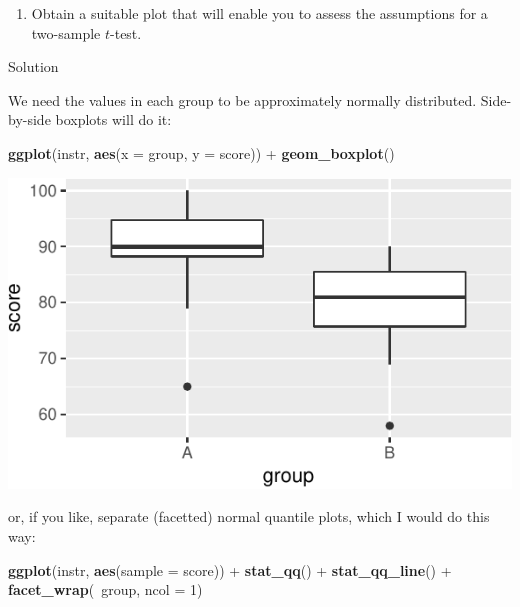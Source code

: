 \documentclass[]{tufte-book}
\newenvironment{Shaded}{}{}
\newcommand{\DataTypeTok}[1]{\textcolor[rgb]{0.56,0.13,0.00}{#1}}
\newcommand{\DecValTok}[1]{\textcolor[rgb]{0.25,0.63,0.44}{#1}}
\newcommand{\KeywordTok}[1]{\textcolor[rgb]{0.00,0.44,0.13}{\textbf{#1}}}
\newcommand{\NormalTok}[1]{#1}
\newcommand{\OperatorTok}[1]{\textcolor[rgb]{0.40,0.40,0.40}{#1}}
\newcommand{\StringTok}[1]{\textcolor[rgb]{0.25,0.44,0.63}{#1}}
\providecommand{\tightlist}{%
  \setlength{\itemsep}{0pt}\setlength{\parskip}{0pt}}
\theoremstyle{definition}
\theoremstyle{definition}
\theoremstyle{definition}
\theoremstyle{remark}
\begin{document}
\begin{enumerate}
\def\labelenumi{(\alph{enumi})}
\setcounter{enumi}{1}
\tightlist
\item
  Obtain a suitable plot that will enable you to assess the assumptions
  for a two-sample \(t\)-test.
\end{enumerate}

Solution

We need the values in each group to be approximately normally
distributed. Side-by-side boxplots will do it:

\begin{Shaded}
\begin{Highlighting}[]
\KeywordTok{ggplot}\NormalTok{(instr, }\KeywordTok{aes}\NormalTok{(}\DataTypeTok{x =}\NormalTok{ group, }\DataTypeTok{y =}\NormalTok{ score)) }\OperatorTok{+}\StringTok{ }\KeywordTok{geom_boxplot}\NormalTok{()}
\end{Highlighting}
\end{Shaded}

\includegraphics{07-sign-mood-median_files/figure-latex/unnamed-chunk-73-1}

or, if you like, separate (facetted) normal quantile plots, which I
would do this way:

\begin{Shaded}
\begin{Highlighting}[]
\KeywordTok{ggplot}\NormalTok{(instr, }\KeywordTok{aes}\NormalTok{(}\DataTypeTok{sample =}\NormalTok{ score)) }\OperatorTok{+}\StringTok{ }\KeywordTok{stat_qq}\NormalTok{() }\OperatorTok{+}\StringTok{ }
\StringTok{    }\KeywordTok{stat_qq_line}\NormalTok{() }\OperatorTok{+}\StringTok{ }\KeywordTok{facet_wrap}\NormalTok{(}\OperatorTok{~}\NormalTok{group, }\DataTypeTok{ncol =} \DecValTok{1}\NormalTok{)}
\end{Highlighting}
\end{Shaded}
\end{document}
